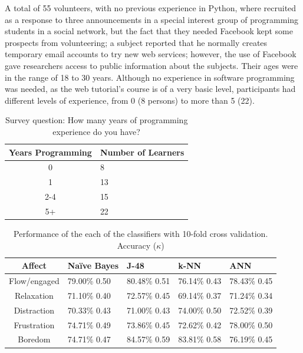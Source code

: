 \documentclass[a4paper,twoside]{article}
\begin{document}
A total of 55 volunteers, with no previous experience in Python, where recruited
as a response to three announcements in a special interest group of programming
students in a social network, but the fact that they needed Facebook kept some prospects from
volunteering; a subject reported that he normally creates temporary email
accounts to try new web services; however, the use of Facebook gave researchers access to public
information about the subjects. Their ages were in the range of 18 to
30 years. Although no experience in software programming was needed, as the
web tutorial's course is of a very basic level, participants had
different levels of experience, from 0 (8 persons) to more than 5 (22).

\begin{table}[!t]
\centering
\caption{ Survey question: How many years of programming experience do you have? }
\label{tab_results}
    \begin{tabular}{ | c | l | }
    \hline
    Years Programming          & Number of Learners \\
    \hline
   		0   &  8 \\
    \hline
    	1   &  13\\
    \hline
    	2-4  & 15\\
    \hline
    	5+   & 22\\
    \hline
    \end{tabular}

\end{table}


\begin{table}[!t]
\centering
\caption{Performance of the each of the classifiers with 10-fold cross validation. Accuracy ($\kappa$) }
\label{tab_performance}
    \begin{tabular}{ | c | l | l | l | l | }
    \hline
    Affect          & Na\"ive Bayes           & J-48                & k-NN              & ANN \\
    \hline
    Flow/engaged    & 79.00\% 0.50 & 80.48\% 0.51 & 76.14\% 0.43 & 78.43\% 0.45 \\
    \hline
    Relaxation      & 71.10\% 0.40 & 72.57\% 0.45 & 69.14\% 0.37 & 71.24\% 0.34\\
    \hline
    Distraction     & 70.33\% 0.43 & 71.00\% 0.43 & 74.00\% 0.50 & 72.52\% 0.39\\
    \hline
    Frustration     & 74.71\% 0.49 & 73.86\% 0.45 & 72.62\% 0.42 & 78.00\% 0.50\\
    \hline
    Boredom         & 74.71\% 0.47 & 84.57\% 0.59 & 83.81\% 0.58 & 76.19\% 0.45\\
    \hline
    \end{tabular}
\end{table}
\end{document}
